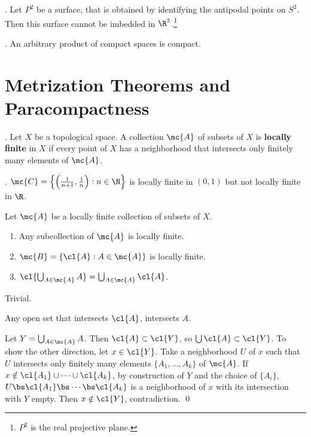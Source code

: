 \ex. Let \(P^2\) be a surface, that is obtained by identifying the antipodal points on \(S^2\). Then this surface cannot be imbedded in \(\R^3\).\footnote{\(P^2\) is the real projective plane.}


\thm. An arbitrary product of compact spaces is compact.

\setcounter{chapter}{5}
\chapter{Metrization Theorems and Paracompactness}

\setcounter{topic}{38}

.  Let \(X\) be a topological space. A collection \(\mc{A}\) of subsets of \(X\) is \textbf{locally finite} in \(X\) if every point of \(X\) has a neighborhood that intersects only finitely many elements of \(\mc{A}\).

\ex. \(\mc{C} = \left\{\left(\frac{1}{n+1}, \frac{1}{n}\right): n \in \N\right\}\) is locally finite in \((0, 1)\) but not locally finite in \(\R\).

 Let \(\mc{A}\) be a locally finite collection of subsets of \(X\).
\begin{enumerate}
    \item Any subcollection of \(\mc{A}\) is locally finite.
    \item \(\mc{B} = \{\cl{A}: A \in \mc{A}\}\) is locally finite.
    \item \(\cl{\bigcup_{A \in \mc{A}} A} = \bigcup_{A \in \mc{A}} \cl{A}\).
\end{enumerate}

\pf {} Trivial.

 Any open set that intersects \(\cl{A}\), intersects \(A\).

 Let \(Y = \bigcup_{A \in \mc{A}} A\). Then \(\cl{A} \subset \cl{Y}\), so \(\bigcup \cl{A} \subset \cl{Y}\). To show the other direction, let \(x \in \cl{Y}\). Take a neighborhood \(U\) of \(x\) such that \(U\) intersects only finitely many elements \(\{A_1, \dots, A_k\}\) of \(\mc{A}\). If \(x \notin \cl{A_1} \cup \cdots \cup \cl{A_k}\), by construction of \(Y\) and the choice of \(\{A_i\}\), \(U \bs \cl{A_1} \bs \cdots \bs \cl{A_k}\) is a neighborhood of \(x\) with its intersection with \(Y\) empty. Then \(x \notin \cl{Y}\), contradiction. \qed

\pagebreak

